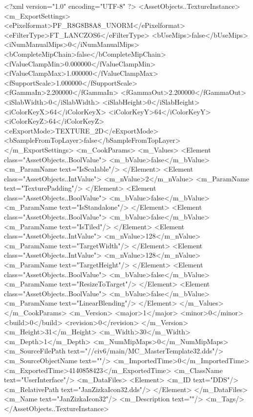 <?xml version="1.0" encoding="UTF-8" ?>
<AssetObjects..TextureInstance>
	<m_ExportSettings>
		<ePixelformat>PF_R8G8B8A8_UNORM</ePixelformat>
		<eFilterType>FT_LANCZOS6</eFilterType>
		<bUseMips>false</bUseMips>
		<iNumManualMips>0</iNumManualMips>
		<bCompleteMipChain>false</bCompleteMipChain>
		<fValueClampMin>0.000000</fValueClampMin>
		<fValueClampMax>1.000000</fValueClampMax>
		<fSupportScale>1.000000</fSupportScale>
		<fGammaIn>2.200000</fGammaIn>
		<fGammaOut>2.200000</fGammaOut>
		<iSlabWidth>0</iSlabWidth>
		<iSlabHeight>0</iSlabHeight>
		<iColorKeyX>64</iColorKeyX>
		<iColorKeyY>64</iColorKeyY>
		<iColorKeyZ>64</iColorKeyZ>
		<eExportMode>TEXTURE_2D</eExportMode>
		<bSampleFromTopLayer>false</bSampleFromTopLayer>
	</m_ExportSettings>
	<m_CookParams>
		<m_Values>
			<Element class="AssetObjects..BoolValue">
				<m_bValue>false</m_bValue>
				<m_ParamName text="IsScalable"/>
			</Element>
			<Element class="AssetObjects..IntValue">
				<m_nValue>2</m_nValue>
				<m_ParamName text="TexturePadding"/>
			</Element>
			<Element class="AssetObjects..BoolValue">
				<m_bValue>false</m_bValue>
				<m_ParamName text="IsStandalone"/>
			</Element>
			<Element class="AssetObjects..BoolValue">
				<m_bValue>false</m_bValue>
				<m_ParamName text="IsTiled"/>
			</Element>
			<Element class="AssetObjects..IntValue">
				<m_nValue>128</m_nValue>
				<m_ParamName text="TargetWidth"/>
			</Element>
			<Element class="AssetObjects..IntValue">
				<m_nValue>128</m_nValue>
				<m_ParamName text="TargetHeight"/>
			</Element>
			<Element class="AssetObjects..BoolValue">
				<m_bValue>false</m_bValue>
				<m_ParamName text="ResizeToTarget"/>
			</Element>
			<Element class="AssetObjects..BoolValue">
				<m_bValue>false</m_bValue>
				<m_ParamName text="LinearBlending"/>
			</Element>
		</m_Values>
	</m_CookParams>
	<m_Version>
		<major>1</major>
		<minor>0</minor>
		<build>0</build>
		<revision>0</revision>
	</m_Version>
	<m_Height>31</m_Height>
	<m_Width>30</m_Width>
	<m_Depth>1</m_Depth>
	<m_NumMipMaps>0</m_NumMipMaps>
	<m_SourceFilePath text="//civ6/main/MC_MasterTemplate\Textures\JanZizkaIcon32.dds"/>
	<m_SourceObjectName text=""/>
	<m_ImportedTime>0</m_ImportedTime>
	<m_ExportedTime>4140858423</m_ExportedTime>
	<m_ClassName text="UserInterface"/>
	<m_DataFiles>
		<Element>
			<m_ID text="DDS"/>
			<m_RelativePath text="JanZizkaIcon32.dds"/>
		</Element>
	</m_DataFiles>
	<m_Name text="JanZizkaIcon32"/>
	<m_Description text=""/>
	<m_Tags/>
</AssetObjects..TextureInstance>

